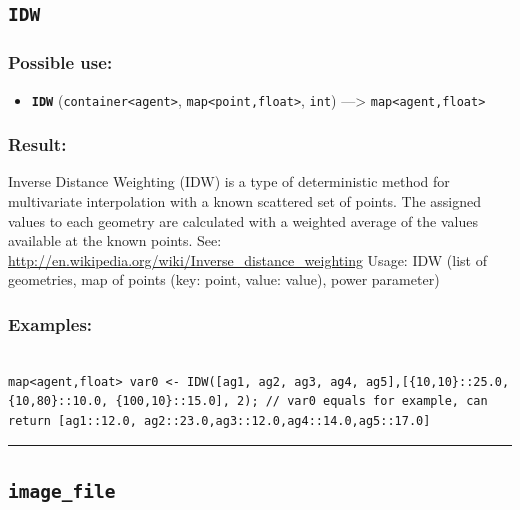 \documentclass[]{book}
\providecommand{\tightlist}{%
  \setlength{\itemsep}{0pt}\setlength{\parskip}{0pt}}
\theoremstyle{definition}
\theoremstyle{definition}
\theoremstyle{definition}
\theoremstyle{remark}
\begin{document}
\subsection{\texorpdfstring{\texttt{IDW}}{IDW}}\label{idw}

\subsubsection{Possible use:}\label{possible-use-263}

\begin{itemize}
\tightlist
\item
  \textbf{\texttt{IDW}}
  (\texttt{container\textless{}agent\textgreater{}},
  \texttt{map\textless{}point,float\textgreater{}}, \texttt{int})
  ---\textgreater{} \texttt{map\textless{}agent,float\textgreater{}}
\end{itemize}

\subsubsection{Result:}\label{result-253}

Inverse Distance Weighting (IDW) is a type of deterministic method for
multivariate interpolation with a known scattered set of points. The
assigned values to each geometry are calculated with a weighted average
of the values available at the known points. See:
\url{http://en.wikipedia.org/wiki/Inverse_distance_weighting} Usage: IDW
(list of geometries, map of points (key: point, value: value), power
parameter)

\subsubsection{Examples:}\label{examples-202}

\begin{verbatim}
 
map<agent,float> var0 <- IDW([ag1, ag2, ag3, ag4, ag5],[{10,10}::25.0, {10,80}::10.0, {100,10}::15.0], 2); // var0 equals for example, can return [ag1::12.0, ag2::23.0,ag3::12.0,ag4::14.0,ag5::17.0]
\end{verbatim}

\begin{center}\rule{0.5\linewidth}{\linethickness}\end{center}

\subsection{\texorpdfstring{\texttt{image\_file}}{image\_file}}\label{image_file}
\end{document}
